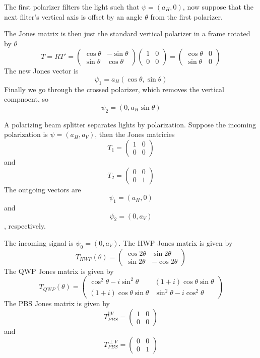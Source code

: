The first polarizer filters the light such that $\psi = (a_H, 0)$, now suppose that the next filter's vertical axis is offset by an angle $\theta$ from the first polarizer.

The Jones matrix is then just the standard vertical polarizer in a frame rotated by $\theta$
$$
T = RT' = \begin{pmatrix}
    \cos \theta & -\sin \theta\\
    \sin \theta & \cos \theta
\end{pmatrix}
\begin{pmatrix}
    1 & 0\\
    0 & 0
\end{pmatrix}
= \begin{pmatrix}
    \cos \theta & 0 \\
    \sin \theta & 0 
\end{pmatrix}
$$
The new Jones vector is
$$
\psi_1 = a_H(\cos \theta, \sin \theta)
$$
Finally we go through the crossed polarizer, which removes the vertical compnoent, so
$$
\psi_2 = (0, a_H \sin \theta)
$$

A polarizing beam splitter separates lights by polarization. Suppose the incoming polarization is $\psi = (a_H, a_V)$, then the Jones matricies
$$
T_1 = \begin{pmatrix}
    1 & 0 \\
    0 & 0
\end{pmatrix}
$$
and
$$
T_2 = \begin{pmatrix}
    0 & 0 \\
    0 & 1
\end{pmatrix}
$$
The outgoing vectors are
$$
\psi_1 = (a_H,0)
$$
and
$$
\psi_2 = (0,a_V)
$$
, respectively.

The incoming signal is $\psi_0 = (0, a_V)$. The HWP Jones matrix is given by
$$
T_{HWP}(\theta) = \begin{pmatrix}
    \cos 2 \theta & \sin 2 \theta\\
    \sin 2 \theta & -\cos 2 \theta 
\end{pmatrix}
$$
The QWP Jones matrix is given by
$$
T_{QWP}(\theta) = \begin{pmatrix}
    \cos^2\theta-i\sin^2\theta & (1+i)\cos \theta \sin \theta\\
    (1+i)\cos \theta \sin \theta & \sin^2 \theta -i \cos^2 \theta 
\end{pmatrix}
$$
The PBS Jones matrix is given by
$$
T_{PBS}^{||V} = \begin{pmatrix}
    1 & 0\\
    0 & 0
\end{pmatrix}
$$
and
$$
T_{PBS}^{\perp V} = \begin{pmatrix}
    0 & 0\\
    0 & 1
\end{pmatrix}
$$

